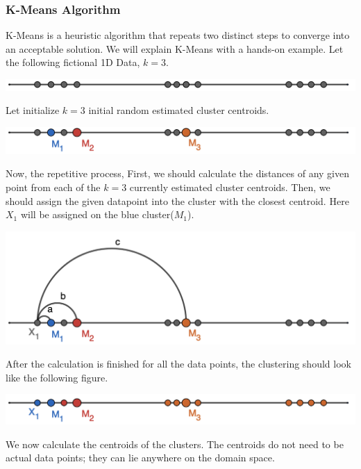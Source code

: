 \documentclass[11pt]{article}
\begin{document}
			\subsubsection*{K-Means Algorithm}
				K-Means is a heuristic algorithm that repeats two distinct steps to converge into an acceptable solution. We will explain K-Means with a hands-on example. Let the following fictional 1D Data, $k=3$.
				\iftrue
				\begin{center}
					\includegraphics[scale=0.5]{res/t1/t12/t12-kmeans-1}
				\end{center}
				\fi
				Let initialize $k=3$ initial random estimated cluster centroids.
				\iftrue
				\begin{center}
					\includegraphics[scale=0.5]{res/t1/t12/t12-kmeans-2}
				\end{center}
				\fi
				Now, the repetitive process, First, we should calculate the distances of any given point from each of the $k=3$ currently estimated cluster centroids. Then, we should assign the given datapoint into the cluster with the closest centroid. Here $X_1$ will be assigned on the blue cluster($M_1$).
				\iftrue
				\begin{center}
					\includegraphics[scale=0.5]{res/t1/t12/t12-kmeans-3}
				\end{center}
				\fi
				After the calculation is finished for all the data points, the clustering should look like the following figure.
				\iftrue
				\begin{center}
					\includegraphics[scale=0.5]{res/t1/t12/t12-kmeans-4}
				\end{center}
				\fi
				We now calculate the centroids of the clusters. The centroids do not need to be actual data points; they can lie anywhere on the domain space.
\end{document}
